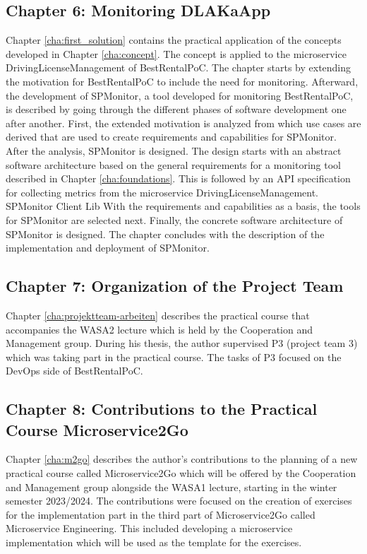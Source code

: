 \subsection*{Chapter 6: Monitoring DLAKaApp}

Chapter \ref{cha:first_solution} contains the practical application of the concepts
developed in Chapter \ref{cha:concept}. The concept is applied to the microservice
DrivingLicenseManagement of BestRentalPoC. The chapter starts by extending the motivation
for BestRentalPoC to include the need for monitoring. Afterward, the development
of SPMonitor, a tool developed for monitoring BestRentalPoC, is described by going through
the different phases of software development one after another. First, the extended
motivation is analyzed from which use cases are derived that are used to
create requirements and capabilities for SPMonitor. After the analysis,
SPMonitor is designed. The design starts with an abstract software architecture
based on the general requirements for a monitoring tool described in Chapter \ref{cha:foundations}.
This is followed by an API specification for collecting metrics from the microservice DrivingLicenseManagement.
SPMonitor Client Lib
With the requirements and capabilities as a basis, the tools for SPMonitor are selected next.
Finally, the concrete software architecture of SPMonitor is designed.
The chapter concludes with the description of the implementation and deployment of SPMonitor.

\subsection*{Chapter 7: Organization of the Project Team}

Chapter \ref{cha:projektteam-arbeiten} describes the practical course
that accompanies the WASA2 lecture which is held by the Cooperation and Management group.
During his thesis, the author supervised P3 (project team 3) which was taking
part in the practical course. The tasks of P3 focused on the DevOps side of
BestRentalPoC.

\subsection*{Chapter 8: Contributions to the Practical Course Microservice2Go}

Chapter \ref{cha:m2go} describes the author's contributions to the planning
of a new practical course called Microservice2Go which will be offered by the
Cooperation and Management group alongside the WASA1 lecture, starting in the winter semester
2023/2024. The contributions were focused on the creation of exercises for the implementation part
in the third part of Microservice2Go called Microservice Engineering. This included
developing a microservice implementation which will be used as the template for the exercises.

